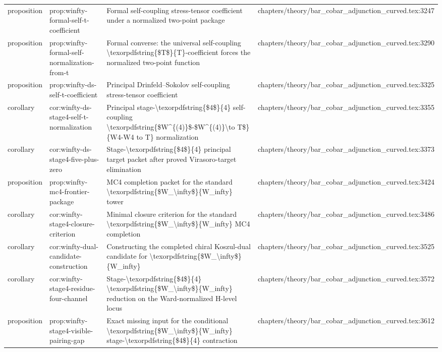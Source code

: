\documentclass[11pt]{article}
\begin{document}
\begin{longtable}{L{0.10\textwidth}L{0.26\textwidth}L{0.42\textwidth}L{0.22\textwidth}}
proposition & prop:winfty-formal-self-t-coefficient & Formal self-coupling stress-tensor coefficient under a normalized two-point package & chapters/theory/bar\_cobar\_adjunction\_curved.tex:3247\\
proposition & prop:winfty-formal-self-normalization-from-t & Formal converse: the universal self-coupling \textbackslash{}texorpdfstring\{\$T\$\}\{T\}-coefficient forces the normalized two-point function & chapters/theory/bar\_cobar\_adjunction\_curved.tex:3290\\
proposition & prop:winfty-ds-self-t-coefficient & Principal Drinfeld--Sokolov self-coupling stress-tensor coefficient & chapters/theory/bar\_cobar\_adjunction\_curved.tex:3325\\
corollary & cor:winfty-ds-stage4-self-t-normalization & Principal stage-\textbackslash{}texorpdfstring\{\$4\$\}\{4\} self-coupling \textbackslash{}texorpdfstring\{\$W\textasciicircum{}\{(4)\}\$-\$W\textasciicircum{}\{(4)\}\textbackslash{}to T\$\}\{W4-W4 to T\} normalization & chapters/theory/bar\_cobar\_adjunction\_curved.tex:3355\\
corollary & cor:winfty-ds-stage4-five-plus-zero & Stage-\textbackslash{}texorpdfstring\{\$4\$\}\{4\} principal target packet after proved Virasoro-target elimination & chapters/theory/bar\_cobar\_adjunction\_curved.tex:3373\\
proposition & prop:winfty-mc4-frontier-package & MC4 completion packet for the standard \textbackslash{}texorpdfstring\{\$W\_\textbackslash{}infty\$\}\{W\_infty\} tower & chapters/theory/bar\_cobar\_adjunction\_curved.tex:3424\\
corollary & cor:winfty-stage4-closure-criterion & Minimal closure criterion for the standard \textbackslash{}texorpdfstring\{\$W\_\textbackslash{}infty\$\}\{W\_infty\} MC4 completion & chapters/theory/bar\_cobar\_adjunction\_curved.tex:3486\\
corollary & cor:winfty-dual-candidate-construction & Constructing the completed chiral Koszul-dual candidate for \textbackslash{}texorpdfstring\{\$W\_\textbackslash{}infty\$\}\{W\_infty\} & chapters/theory/bar\_cobar\_adjunction\_curved.tex:3525\\
corollary & cor:winfty-stage4-residue-four-channel & Stage-\textbackslash{}texorpdfstring\{\$4\$\}\{4\} \textbackslash{}texorpdfstring\{\$W\_\textbackslash{}infty\$\}\{W\_infty\} reduction on the Ward-normalized H-level locus & chapters/theory/bar\_cobar\_adjunction\_curved.tex:3572\\
proposition & prop:winfty-stage4-visible-pairing-gap & Exact missing input for the cond{}itional \textbackslash{}texorpdfstring\{\$W\_\textbackslash{}infty\$\}\{W\_infty\} stage-\textbackslash{}texorpdfstring\{\$4\$\}\{4\} contraction & chapters/theory/bar\_cobar\_adjunction\_curved.tex:3612\\

\end{longtable}
\end{document}
